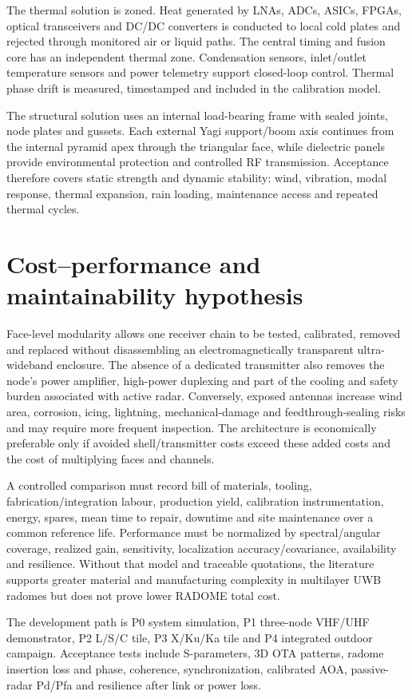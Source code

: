 The thermal solution is zoned. Heat generated by LNAs, ADCs, ASICs, FPGAs, optical transceivers and DC/DC converters is conducted to local cold plates and rejected through monitored air or liquid paths. The central timing and fusion core has an independent thermal zone. Condensation sensors, inlet/outlet temperature sensors and power telemetry support closed-loop control. Thermal phase drift is measured, timestamped and included in the calibration model.

The structural solution uses an internal load-bearing frame with sealed joints, node plates and gussets. Each external Yagi support/boom axis continues from the internal pyramid apex through the triangular face, while dielectric panels provide environmental protection and controlled RF transmission. Acceptance therefore covers static strength and dynamic stability: wind, vibration, modal response, thermal expansion, rain loading, maintenance access and repeated thermal cycles.

\section{Cost--performance and maintainability hypothesis}
Face-level modularity allows one receiver chain to be tested, calibrated, removed and replaced without disassembling an electromagnetically transparent ultra-wideband enclosure. The absence of a dedicated transmitter also removes the node's power amplifier, high-power duplexing and part of the cooling and safety burden associated with active radar. Conversely, exposed antennas increase wind area, corrosion, icing, lightning, mechanical-damage and feedthrough-sealing risks and may require more frequent inspection. The architecture is economically preferable only if avoided shell/transmitter costs exceed these added costs and the cost of multiplying faces and channels.

A controlled comparison must record bill of materials, tooling, fabrication/integration labour, production yield, calibration instrumentation, energy, spares, mean time to repair, downtime and site maintenance over a common reference life. Performance must be normalized by spectral/angular coverage, realized gain, sensitivity, localization accuracy/covariance, availability and resilience. Without that model and traceable quotations, the literature supports greater material and manufacturing complexity in multilayer UWB radomes but does not prove lower RADOME total cost.

The development path is P0 system simulation, P1 three-node VHF/UHF demonstrator, P2 L/S/C tile, P3 X/Ku/Ka tile and P4 integrated outdoor campaign. Acceptance tests include S-parameters, 3D OTA patterns, radome insertion loss and phase, coherence, synchronization, calibrated AOA, passive-radar Pd/Pfa and resilience after link or power loss.

